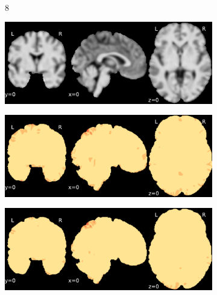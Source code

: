 \documentclass{article}
\begin{document}
\begin{landscape}
\begin{figure}
\begin{subfigure}[t]{0.2\paperheight}
        \end{subfigure} \\
        \begin{subfigure}[b][][c]{0.01\paperwidth} 8 \vspace*{15pt} \end{subfigure}
        \begin{subfigure}[t]{0.2\paperheight}
            \centering
            \includegraphics[width=\textwidth]{figures/ieee_T1/fwhm_5/ieee_ds002338_sub-xp207.pdf}
        \end{subfigure}
        \begin{subfigure}[t]{0.2\paperheight}
            \centering
            \includegraphics[width=\textwidth]{figures/sig/fwhm_5/rr_ds002338_sub-xp207_sig.pdf}
        \end{subfigure}
        \begin{subfigure}[t]{0.2\paperheight}
            \centering
            \includegraphics[width=\textwidth]{figures/sig/fwhm_5/rs_ds002338_sub-xp207_sig.pdf}

\end{subfigure}
\end{figure}
\end{landscape}
\end{document}
